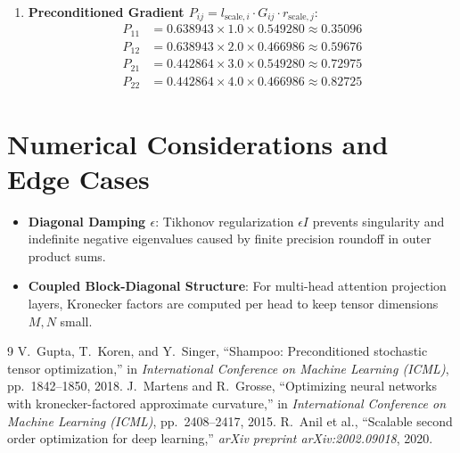 \documentclass[11pt,a4paper]{article}
\theoremstyle{definition}
\begin{document}
\begin{enumerate}
\begin{align}
    r_{\text{scale}, 2} &= (R_{22} + 1)^{-1/4} = (20 + 1)^{-1/4} = 21^{-0.25} \approx 0.466986
    \end{align}
    \item \textbf{Preconditioned Gradient $P_{ij} = l_{\text{scale}, i} \cdot G_{ij} \cdot r_{\text{scale}, j}$}:
    \begin{align}
    P_{11} &= 0.638943 \times 1.0 \times 0.549280 \approx 0.35096 \\
    P_{12} &= 0.638943 \times 2.0 \times 0.466986 \approx 0.59676 \\
    P_{21} &= 0.442864 \times 3.0 \times 0.549280 \approx 0.72975 \\
    P_{22} &= 0.442864 \times 4.0 \times 0.466986 \approx 0.82725
    \end{align}
\end{enumerate}

\section{Numerical Considerations and Edge Cases}

\begin{itemize}
    \item \textbf{Diagonal Damping $\epsilon$}: Tikhonov regularization $\epsilon I$ prevents singularity and indefinite negative eigenvalues caused by finite precision roundoff in outer product sums.
    \item \textbf{Coupled Block-Diagonal Structure}: For multi-head attention projection layers, Kronecker factors are computed per head to keep tensor dimensions $M, N$ small.
\end{itemize}

\begin{thebibliography}{9}
 V.~Gupta, T.~Koren, and Y.~Singer, ``Shampoo: Preconditioned stochastic tensor optimization,'' in \emph{International Conference on Machine Learning (ICML)}, pp.~1842--1850, 2018.
 J.~Martens and R.~Grosse, ``Optimizing neural networks with kronecker-factored approximate curvature,'' in \emph{International Conference on Machine Learning (ICML)}, pp.~2408--2417, 2015.
 R.~Anil et al., ``Scalable second order optimization for deep learning,'' \emph{arXiv preprint arXiv:2002.09018}, 2020.
\end{thebibliography}
\end{document}
